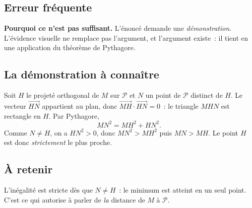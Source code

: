 

\subsection*{Erreur fréquente}


\textbf{Pourquoi ce n'est pas suffisant.} L'énoncé demande une
\emph{démonstration}. L'évidence visuelle ne remplace pas l'argument, et
l'argument existe~: il tient en une application du théorème de Pythagore.

\subsection*{La démonstration à connaître}

Soit $H$ le projeté orthogonal de $M$ sur $\mathcal{P}$ et $N$ un point de
$\mathcal{P}$ distinct de $H$. Le vecteur $\vec{HN}$ appartient au plan, donc
$\vec{MH}\cdot\vec{HN}=0$~: le triangle $MHN$ est rectangle en $H$. Par
Pythagore,
\[
  MN^{2}=MH^{2}+HN^{2}.
\]
Comme $N\neq H$, on a $HN^{2}>0$, donc $MN^{2}>MH^{2}$ puis $MN>MH$. Le point
$H$ est donc \emph{strictement} le plus proche.

\subsection*{À retenir}

L'inégalité est stricte dès que $N\neq H$~: le minimum est atteint en un seul
point. C'est ce qui autorise à parler de \emph{la} distance de $M$ à
$\mathcal{P}$.

